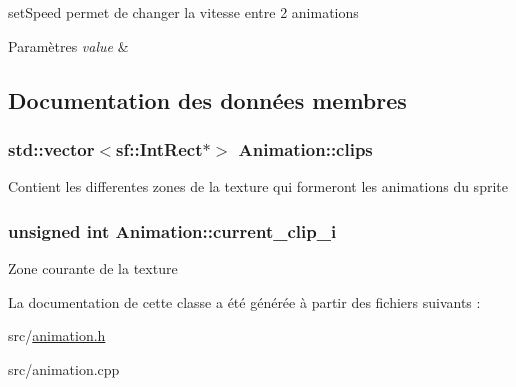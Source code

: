 set\+Speed permet de changer la vitesse entre 2 animations 


\begin{DoxyParams}{Paramètres}
{\em value} & \\
\hline
\end{DoxyParams}


\subsection{Documentation des données membres}
\hypertarget{class_animation_ac0d3fda2efad8b0fb735ec91630fd298}{
\subsubsection[{clips}]{\setlength{\rightskip}{0pt plus 5cm}std\+::vector$<$sf\+::\+Int\+Rect$\ast$$>$ Animation\+::clips\hspace{0.3cm}{\ttfamily [protected]}}}\label{class_animation_ac0d3fda2efad8b0fb735ec91630fd298}
Contient les differentes zones de la texture qui formeront les animations du sprite \hypertarget{class_animation_a20db3ec79637b08198679b634886ba38}{
\subsubsection[{current\+\_\+clip\+\_\+i}]{\setlength{\rightskip}{0pt plus 5cm}unsigned int Animation\+::current\+\_\+clip\+\_\+i\hspace{0.3cm}{\ttfamily [protected]}}}\label{class_animation_a20db3ec79637b08198679b634886ba38}
Zone courante de la texture 

La documentation de cette classe a été générée à partir des fichiers suivants \+:\begin{DoxyCompactItemize}
\item 
src/\hyperlink{animation_8h}{animation.\+h}\item 
src/animation.\+cpp\end{DoxyCompactItemize}
